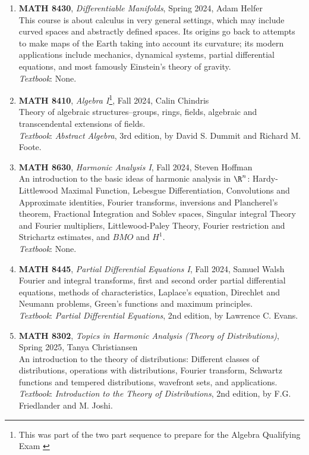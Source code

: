 \documentclass{article}
\begin{document}
\begin{enumerate}[leftmargin=*]
    \item[] \textbf{MATH 8430}, \textit{Differentiable Manifolds}, Spring 2024, Adam Helfer\\
    This course is about calculus in very general settings, which may include curved spaces and abstractly defined spaces. Its origins go back to attempts to make maps of the Earth taking into account its curvature; its modern applications include mechanics, dynamical systems, partial differential equations, and most famously Einstein's theory of gravity. \\
    \textit{Textbook}: None. 

    \item[] \textbf{MATH 8410}, \textit{Algebra I}\footnote{This was part of the two part sequence to prepare for the Algebra Qualifying Exam \label{Algebra Qual}}, Fall 2024, Calin Chindris\\
    Theory of algebraic structures--groups, rings, fields, algebraic and transcendental extensions of fields. \\
    \textit{Textbook}: \textit{Abstract Algebra}, 3rd edition, by David S. Dummit and Richard M. Foote. 
    
    \item[] \textbf{MATH 8630}, \textit{Harmonic Analysis I}, Fall 2024, Steven Hoffman \\
    An introduction to the basic ideas of harmonic analysis in $\R^n$: Hardy-Littlewood Maximal Function, Lebesgue Differentiation, Convolutions and Approximate identities, Fourier transforms, inversions and Plancherel's theorem, Fractional Integration and Soblev spaces, Singular integral Theory and Fourier multipliers, Littlewood-Paley Theory, Fourier restriction and Strichartz estimates, and $BMO$ and $H^1$.\\
    \textit{Textbook}: None.  

    \item[] \textbf{MATH 8445}, \textit{Partial Differential Equations I}, Fall 2024, Samuel Walsh\\
    Fourier and integral transforms, first and second order partial differential equations, methods of characteristics, Laplace's equation, Direchlet and Neumann problems, Green's functions and maximum principles. \\
    \textit{Textbook}: \textit{Partial Differential Equations}, 2nd edition, by Lawrence C. Evans. 

    \item[] \textbf{MATH 8302}, \textit{Topics in Harmonic Analysis (Theory of Distributions)}, Spring 2025, Tanya Christiansen\\
    An introduction to the theory of distributions: Different classes of distributions, operations with distributions, Fourier transform, Schwartz functions and tempered distributions, wavefront sets, and applications. \\
    \textit{Textbook}: \textit{Introduction to the Theory of Distributions}, 2nd edition, by F.G. Friedlander and M. Joshi.
    

\end{enumerate}
\end{document}
